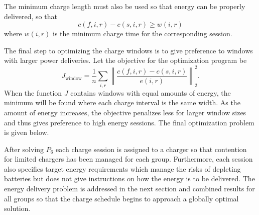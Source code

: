 The minimum charge length must also be used so that energy can be properly delivered, so that
\begin{equation}\label{eqn:optChargeSchedules:eqn2}
	c(f,i,r) - c(s,i,r) \ge w(i,r)
\end{equation}
where $w(i,r)$ is the minimum charge time for the corresponding session.
\par The final step to optimizing the charge windows is to give preference to windows with larger power deliveries. Let the objective for the optimization program be 
\begin{equation}\label{eqn:optChargeSchedule:objective}
	J_{\text{window}} = \frac{1}{n}\sum_{i,r} \left \lVert \frac{c(f,i,r) - c(s,i,r)}{e(i,r)} \right \rVert^2_2.
\end{equation}
When the function $J$ contains windows with equal amounts of energy, the minimum will be found where each charge interval is the same width. As the amount of energy increases, the objective penalizes less for larger window sizes and thus gives preference to high energy sessions.
The final optimization problem is given below.\\[0.1in]
\par After solving $P_6$ each charge session is assigned to a charger so that contention for limited chargers has been managed for each group. Furthermore, each session also specifies target energy requirements which manage the risks of depleting batteries but does not give instructions on how the energy is to be delivered. The energy delivery problem is addressed in the next section and combined results for all groups so that the charge schedule begins to approach a globally optimal solution.
